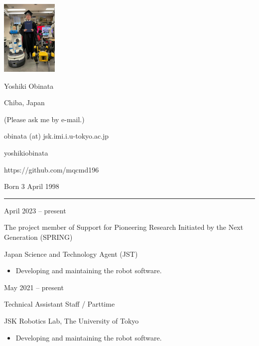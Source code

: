 \documentclass[a4paper,10pt]{article}
\newlength{\cvcolumngapwidth}
\newlength{\cvleftcolumnwidth}
\newlength{\cvrightcolumnwidth}
\newcommand{\cvnamestyle}[1]{{\Large\cvnamefont\textcolor{cvnamecolor}{#1}}}
\newcommand{\cvsectionstyle}[1]{{\normalsize\cvsectionfont\textcolor{cvsectioncolor}{#1}}}
\newcommand{\cvtitlestyle}[1]{{\large\cvtitlefont\textcolor{cvtitlecolor}{#1}}}
\newcommand{\cvdurationstyle}[1]{{\small\cvdurationfont\textcolor{cvdurationcolor}{#1}}}
\newlength{\cvafteritemskipamount}
\newlength{\cvaftersectionskipamount}
\newlength{\cvafternameskipamount}
\newlength{\cvafterpersonalinfolineskipamount}
\newlength{\cvaftertitleskipamount}
\newlength{\cvparskip}
\newcommand{\cvpersonalinfo}[2]{
    \begin{minipage}[t]{\cvleftcolumnwidth}
        \vspace{0mm} %
        \raggedleft #1
    \end{minipage}%
    \hspace{\cvcolumngapwidth}%
    \begin{minipage}[t]{\cvrightcolumnwidth}
        \vspace{0mm} %
        #2
    \end{minipage}

    \vspace{\cvafteritemskipamount}
}
\newcommand{\cvname}[1]{
    \cvnamestyle{#1}

    \vspace{\cvafternameskipamount}
}
\newcommand{\cvpersonalinfolinewithicon}[3]{
    \raisebox{.5\fontcharht\font`E-.5\height}{\texttt{[image: \#2]}}
    #3

    \vspace{\cvafterpersonalinfolineskipamount}
}
\newcommand{\cvsection}[1]{
    \begin{minipage}[t]{\cvleftcolumnwidth}
        \raggedleft\cvsectionstyle{#1}
    \end{minipage}%
    \hspace{\cvcolumngapwidth}%
    \begin{minipage}[t]{\cvrightcolumnwidth}
        \textcolor{cvrulecolor}{\rule{\cvrightcolumnwidth}{0.3mm}}
    \end{minipage}

    \vspace{\cvaftersectionskipamount}
}
\newcommand{\cvitem}[2]{
    \begin{minipage}[t]{\cvleftcolumnwidth}
        \raggedleft #1
    \end{minipage}%
    \hspace{\cvcolumngapwidth}%
    \begin{minipage}[t]{\cvrightcolumnwidth}
        \setlength{\parskip}{\cvparskip} #2
    \end{minipage}

    \vspace{\cvafteritemskipamount}
}
\newcommand{\cvtitle}[1]{
    \cvtitlestyle{#1}

    \vspace{\cvaftertitleskipamount}
    \vspace{-\cvparskip}
}
\begin{document}

\cvpersonalinfo{
    \includegraphics[height=36mm]{resources/photo.jpg}
}{
    \cvname{Yoshiki Obinata}

    \cvpersonalinfolinewithicon{height=4mm}{resources/IcoMoon-Free-PDF/072-location.pdf}{
        Chiba, Japan
    }

    \cvpersonalinfolinewithicon{height=4mm}{resources/IcoMoon-Free-PDF/067-phone.pdf}{
        (Please ask me by e-mail.)
    }

    \cvpersonalinfolinewithicon{height=4mm}{resources/IcoMoon-Free-PDF/070-envelop.pdf}{
        obinata (at) jsk.imi.i.u-tokyo.ac.jp
    }

    \cvpersonalinfolinewithicon{height=4mm}{resources/IcoMoon-Free-PDF/458-linkedin.pdf}{
        yoshikiobinata
    }

    \cvpersonalinfolinewithicon{height=4mm}{resources/IcoMoon-Free-PDF/433-github.pdf}{
        https://github.com/mqcmd196
    }

    Born 3 April 1998
}



\cvsection{WORK EXPERIENCE}

\cvitem{
  \cvdurationstyle{April 2023 -- present}
}{
  \cvtitle{The project member of Support for Pioneering Research Initiated by the Next Generation (SPRING)}

  Japan Science and Technology Agent (JST)

  \begin{itemize}[leftmargin=*]
    \item Developing and maintaining the robot software.
  \end{itemize}
}

\cvitem{
  \cvdurationstyle{May 2021 -- present}
}{
  \cvtitle{Technical Assistant Staff / Parttime}

  JSK Robotics Lab, The University of Tokyo

  \begin{itemize}[leftmargin=*]
    \item Developing and maintaining the robot software.
  \end{itemize}
}
\end{document}
